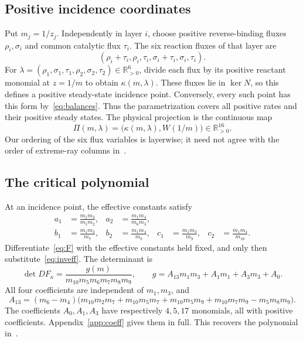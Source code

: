 \documentclass[11pt,a4paper]{article}
\numberwithin{equation}{section}
\theoremstyle{remark}\newtheorem{remark}[theorem]{Remark}
\newcommand{\pos}{\mathbb{R}_{>0}}
\begin{document}
\subsection{Positive incidence coordinates}
Put $m_j=1/z_j$. Independently in layer $i$, choose positive reverse-binding fluxes $\rho_i,\sigma_i$ and common catalytic flux $\tau_i$. The six reaction fluxes of that layer are
\begin{equation}\label{eq:flux}
(\rho_i+\tau_i,\rho_i,\tau_i,\sigma_i+\tau_i,\sigma_i,\tau_i).
\end{equation}
For $\lambda=(\rho_1,\sigma_1,\tau_1,\rho_2,\sigma_2,\tau_2)\in\pos^6$, divide each flux by its positive reactant monomial at $z=1/m$ to obtain $\kappa(m,\lambda)$. These fluxes lie in $\ker N$, so this defines a positive steady-state incidence point. Conversely, every such point has this form by~\eqref{eq:balances}. Thus the parametrization covers all positive rates and their positive steady states. The physical projection is the continuous map
\begin{equation}\label{eq:projection}
\Pi(m,\lambda)=\bigl(\kappa(m,\lambda),W(1/m)\bigr)\in\pos^{16}.
\end{equation}
Our ordering of the six flux variables is layerwise; it need not agree with the order of extreme-ray columns in~\cite{KW}.

\subsection{The critical polynomial}
At an incidence point, the effective constants satisfy
\begin{equation}\label{eq:inveff}
\begin{aligned}
a_1&=\frac{m_1m_3}{m_5m_2},& a_2&=\frac{m_1m_4}{m_6m_3},\\
b_1&=\frac{m_1m_3}{m_7},& b_2&=\frac{m_1m_4}{m_8},&
c_1&=\frac{m_1m_3}{m_9},& c_2&=\frac{m_1m_4}{m_{10}}.
\end{aligned}
\end{equation}
Differentiate~\eqref{eq:F} with the effective constants held fixed, and only then substitute~\eqref{eq:inveff}. The determinant is
\begin{equation}\label{eq:g}
\det DF_\kappa=\frac{g(m)}{m_{10}m_5m_6m_7m_8m_9},\qquad
 g=A_{13}m_1m_3+A_1m_1+A_3m_3+A_0.
\end{equation}
All four coefficients are independent of $m_1,m_3$, and
\begin{equation}\label{eq:A13}
A_{13}=(m_6-m_4)\bigl(m_{10}m_2m_7+m_{10}m_5m_7
 +m_{10}m_5m_9+m_{10}m_7m_9-m_5m_8m_9\bigr).
\end{equation}
The coefficients $A_0,A_1,A_3$ have respectively $4,5,17$ monomials, all with positive coefficients. Appendix~\ref{app:coeff} gives them in full. This recovers the polynomial in~\cite[Eq.~(37)]{KW}.
\end{document}
